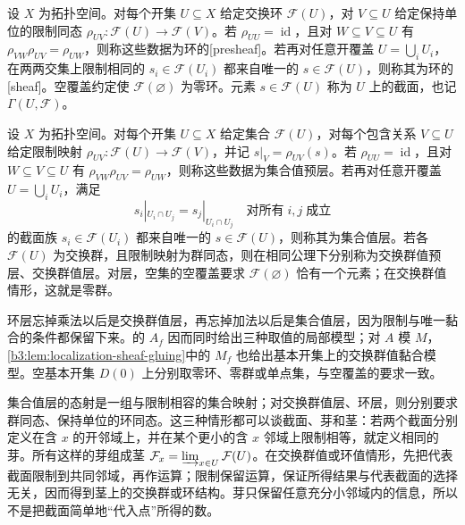 \begin{definition}\label{b3:def:sheaf-rings}
	设 \(X\) 为拓扑空间。对每个开集 \(U\subseteq X\) 给定交换环 \(\mathcal F(U)\)，对 \(V\subseteq U\) 给定保持单位的限制同态 \(\rho_{UV}:\mathcal F(U)\rightarrow\mathcal F(V)\)。若 \(\rho_{UU}=\operatorname{id}\)，且对 \(W\subseteq V\subseteq U\) 有 \(\rho_{VW}\rho_{UV}=\rho_{UW}\)，则称这些数据为环的[presheaf]。若再对任意开覆盖 \(U=\bigcup_iU_i\)，在两两交集上限制相同的 \(s_i\in\mathcal F(U_i)\) 都来自唯一的 \(s\in\mathcal F(U)\)，则称其为环的[sheaf]。空覆盖约定使 \(\mathcal F(\varnothing)\) 为零环。元素 \(s\in\mathcal F(U)\) 称为 \(U\) 上的截面，也记 \(\Gamma(U,\mathcal F)\)。
\end{definition}

\begin{definition}\label{b3:def:sheaf-sets-groups}
	设 \(X\) 为拓扑空间。对每个开集 \(U\subseteq X\) 给定集合 \(\mathcal F(U)\)，对每个包含关系 \(V\subseteq U\) 给定限制映射 \(\rho_{UV}:\mathcal F(U)\rightarrow\mathcal F(V)\)，并记 \(s|_V=\rho_{UV}(s)\)。若 \(\rho_{UU}=\operatorname{id}\)，且对 \(W\subseteq V\subseteq U\) 有 \(\rho_{VW}\rho_{UV}=\rho_{UW}\)，则称这些数据为集合值预层。若再对任意开覆盖 \(U=\bigcup_iU_i\)，满足
	\[
		s_i|_{U_i\cap U_j}=s_j|_{U_i\cap U_j} \quad\text{对所有}\;i,j\;\text{成立}
	\]
	的截面族 \(s_i\in\mathcal F(U_i)\) 都来自唯一的 \(s\in\mathcal F(U)\)，则称其为集合值层。若各 \(\mathcal F(U)\) 为交换群，且限制映射为群同态，则在相同公理下分别称为交换群值预层、交换群值层。对层，空集的空覆盖要求 \(\mathcal F(\varnothing)\) 恰有一个元素；在交换群值情形，这就是零群。
\end{definition}

环层忘掉乘法以后是交换群值层，再忘掉加法以后是集合值层，因为限制与唯一黏合的条件都保留下来。的 \(A_f\) 因而同时给出三种取值的局部模型；对 \(A\) 模 \(M\)，\cref{b3:lem:localization-sheaf-gluing}中的 \(M_f\) 也给出基本开集上的交换群值黏合模型。空基本开集 \(D(0)\) 上分别取零环、零群或单点集，与空覆盖的要求一致。

\ProseParagraphBreak

集合值层的态射是一组与限制相容的集合映射；对交换群值层、环层，则分别要求群同态、保持单位的环同态。这三种情形都可以谈截面、芽和茎：若两个截面分别定义在含 \(x\) 的开邻域上，并在某个更小的含 \(x\) 邻域上限制相等，就定义相同的芽。所有这样的芽组成茎 \(\mathcal F_x=\varinjlim_{x\in U}\mathcal F(U)\)。在交换群值或环值情形，先把代表截面限制到共同邻域，再作运算；限制保留运算，保证所得结果与代表截面的选择无关，因而得到茎上的交换群或环结构。芽只保留任意充分小邻域内的信息，所以不是把截面简单地“代入点”所得的数。

